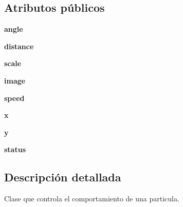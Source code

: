 \subsection*{\-Atributos públicos}
\begin{DoxyCompactItemize}
\item 
\hypertarget{classengine_1_1particle_1_1Particle_a9a80e4f33ba453f501b67895bae9342f}{
{\bfseries angle}}
\label{classengine_1_1particle_1_1Particle_a9a80e4f33ba453f501b67895bae9342f}

\item 
\hypertarget{classengine_1_1particle_1_1Particle_aa443e6696b4b3f178a2a9e4407c69304}{
{\bfseries distance}}
\label{classengine_1_1particle_1_1Particle_aa443e6696b4b3f178a2a9e4407c69304}

\item 
\hypertarget{classengine_1_1particle_1_1Particle_a5fd443e70c7beccd17d131277a05be71}{
{\bfseries scale}}
\label{classengine_1_1particle_1_1Particle_a5fd443e70c7beccd17d131277a05be71}

\item 
\hypertarget{classengine_1_1particle_1_1Particle_a52b360e873eb7a95652e8a5cfa1a5291}{
{\bfseries image}}
\label{classengine_1_1particle_1_1Particle_a52b360e873eb7a95652e8a5cfa1a5291}

\item 
\hypertarget{classengine_1_1particle_1_1Particle_ab9196c9dc924a7690781ea528d290a80}{
{\bfseries speed}}
\label{classengine_1_1particle_1_1Particle_ab9196c9dc924a7690781ea528d290a80}

\item 
\hypertarget{classengine_1_1particle_1_1Particle_ae44ae4bdefe991cf891e3e1a697c4fc9}{
{\bfseries x}}
\label{classengine_1_1particle_1_1Particle_ae44ae4bdefe991cf891e3e1a697c4fc9}

\item 
\hypertarget{classengine_1_1particle_1_1Particle_aa562b993dd4957deb29e889aeadf21b3}{
{\bfseries y}}
\label{classengine_1_1particle_1_1Particle_aa562b993dd4957deb29e889aeadf21b3}

\item 
\hypertarget{classengine_1_1particle_1_1Particle_ac48f68986dcf0fabe8e8e79efb25454b}{
{\bfseries status}}
\label{classengine_1_1particle_1_1Particle_ac48f68986dcf0fabe8e8e79efb25454b}

\end{DoxyCompactItemize}


\subsection{\-Descripción detallada}
\-Clase que controla el comportamiento de una particula. 

